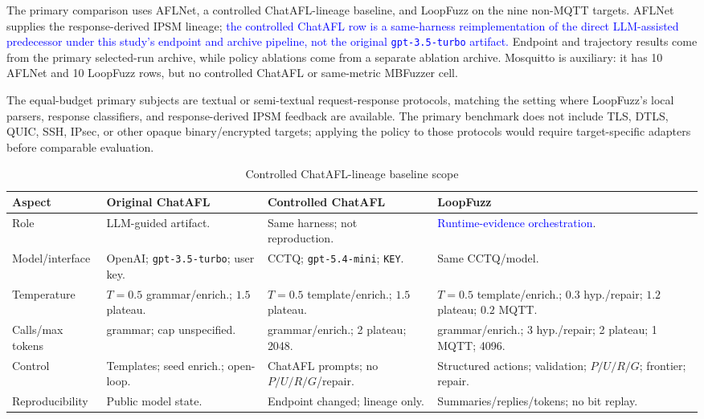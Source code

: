 \documentclass[final,5p,times,number]{elsarticle}
\begin{document}
The primary comparison uses AFLNet, a controlled ChatAFL-lineage baseline, and LoopFuzz on the nine non-MQTT targets. AFLNet supplies the response-derived IPSM lineage; \textcolor{blue}{the controlled ChatAFL row is a same-harness reimplementation of the direct LLM-assisted predecessor under this study's endpoint and archive pipeline, not the original \texttt{gpt-3.5-turbo} artifact.} Endpoint and trajectory results come from the primary selected-run archive, while policy ablations come from a separate ablation archive. Mosquitto is auxiliary: it has 10 AFLNet and 10 LoopFuzz rows, but no controlled ChatAFL or same-metric MBFuzzer cell.

The equal-budget primary subjects are textual or semi-textual request-response protocols, matching the setting where LoopFuzz's local parsers, response classifiers, and response-derived IPSM feedback are available. The primary benchmark does not include TLS, DTLS, QUIC, SSH, IPsec, or other opaque binary/encrypted targets; applying the policy to those protocols would require target-specific adapters before comparable evaluation.

\begin{table}[!t]
\centering
\caption{Controlled ChatAFL-lineage baseline scope}
\label{tab:chatafl_config_scope}
{\scriptsize
\setlength{\tabcolsep}{3.0pt}
\renewcommand{\arraystretch}{1.12}
\begin{tabularx}{\textwidth}{>{\raggedright\arraybackslash}p{}
>{\raggedright\arraybackslash}X
>{\raggedright\arraybackslash}X
>{\raggedright\arraybackslash}X}
\toprule
Aspect & Original ChatAFL & Controlled ChatAFL & LoopFuzz \\
\midrule
Role &
LLM-guided artifact. &
Same harness; not reproduction. &
\textcolor{blue}{Runtime-evidence orchestration}. \\
Model/interface &
OpenAI; \texttt{gpt-3.5-turbo}; user key. &
CCTQ; \texttt{gpt-5.4-mini}; \texttt{KEY}. &
Same CCTQ/model. \\
Temperature &
$T{=}0.5$ grammar/enrich.; $1.5$ plateau. &
$T{=}0.5$ template/enrich.; $1.5$ plateau. &
$T{=}0.5$ template/enrich.; $0.3$ hyp./repair; $1.2$ plateau; $0.2$ MQTT. \\
Calls/max tokens &
5 grammar; cap unspecified. &
5 grammar/enrich.; 2 plateau; 2048. &
5 grammar/enrich.; 3 hyp./repair; 2 plateau; 1 MQTT; 4096. \\
Control &
Templates; seed enrich.; open-loop. &
ChatAFL prompts; no $P/U/R/G$/repair. &
Structured actions; validation; $P/U/R/G$; frontier; repair. \\
Reproducibility &
Public model state. &
Endpoint changed; lineage only. &
Summaries/replies/tokens; no bit replay. \\
\bottomrule
\end{tabularx}
}
\end{table}
\end{document}
